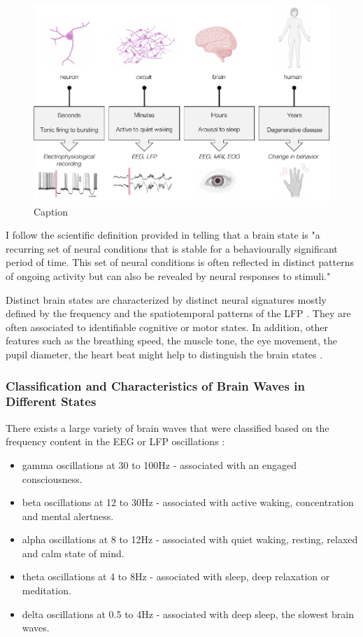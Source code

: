\begin{figure}[h!]
    \centering
    \includegraphics{latex/fig/Intro/Bdg_BScale.pdf}
    \caption{Caption}
    \label{fig:my_label}
\end{figure}

I follow the scientific definition provided in \citep{bradley_state-dependent_2022,zagha_edward_mccormick_neural_2014} telling that a brain state is "a recurring set of neural conditions that is stable for a behaviourally significant period of time. This set of neural conditions is often reflected in distinct patterns of ongoing activity but can also be revealed by neural responses to stimuli." 

Distinct brain states are characterized by distinct neural signatures mostly defined by the frequency and the spatiotemporal patterns of the LFP \citep{kringelbach_brain_2020}. They are often associated to identifiable cognitive or motor states. In addition, other features such as the breathing speed, the muscle tone, the eye movement, the pupil diameter, the heart beat might help to distinguish the brain states \citep{reimer_pupil_2014, mcginley_waking_2015}. 

\subsubsection{Classification and Characteristics of Brain Waves in Different States}
 There exists a large variety of brain waves that were classified based on the frequency content in the EEG or LFP oscillations \citep{tyree_optogenetic_2017}: 
\begin{itemize}
    \item gamma oscillations at 30 to 100Hz - associated with an engaged consciousness.  
    \item beta oscillations at 12 to 30Hz - associated with active waking, concentration and mental alertness.
    \item alpha oscillations at 8 to 12Hz - associated with quiet waking, resting, relaxed and calm state of mind.
    \item theta oscillations at 4 to 8Hz - associated with sleep, deep relaxation or meditation.
     \item delta oscillations at 0.5 to 4Hz - associated with deep sleep, the slowest brain waves.
    
\end{itemize}

